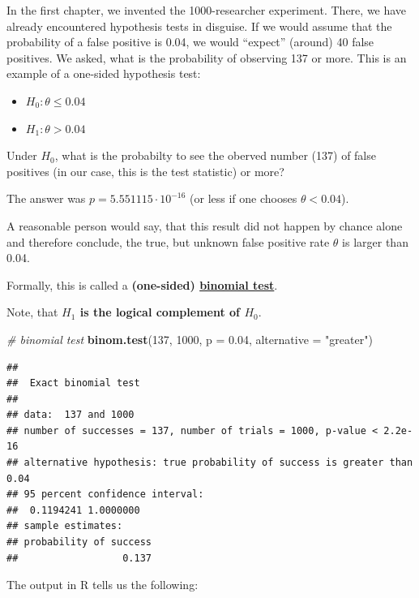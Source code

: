 \documentclass[
]{book}
\newenvironment{Shaded}{\begin{snugshade}}{\end{snugshade}}
\newcommand{\AttributeTok}[1]{\textcolor[rgb]{0.13,0.29,0.53}{#1}}
\newcommand{\CommentTok}[1]{\textcolor[rgb]{0.56,0.35,0.01}{\textit{#1}}}
\newcommand{\DecValTok}[1]{\textcolor[rgb]{0.00,0.00,0.81}{#1}}
\newcommand{\FloatTok}[1]{\textcolor[rgb]{0.00,0.00,0.81}{#1}}
\newcommand{\FunctionTok}[1]{\textcolor[rgb]{0.13,0.29,0.53}{\textbf{#1}}}
\newcommand{\NormalTok}[1]{#1}
\newcommand{\StringTok}[1]{\textcolor[rgb]{0.31,0.60,0.02}{#1}}
\providecommand{\tightlist}{%
  \setlength{\itemsep}{0pt}\setlength{\parskip}{0pt}}
\begin{document}
In the first chapter, we invented the 1000-researcher experiment. There, we have already encountered hypothesis tests in disguise.
If we would assume that the probability of a false positive is 0.04,
we would ``expect'' (around) 40 false positives. We asked, what is the probability of observing
137 or more. This is an example of a one-sided hypothesis test:

\begin{itemize}
\tightlist
\item
  \(H_0: \theta \le 0.04\)
\item
  \(H_1: \theta > 0.04\)
\end{itemize}

Under \(H_0\), what is the probabilty to see the oberved number (137) of
false positives (in our case, this is the test statistic) or more?

The answer was \(p = 5.551115 \cdot 10^{-16}\) (or less if one chooses \(\theta < 0.04\)).

A reasonable person would say, that this result did not happen by chance alone and
therefore conclude, the true, but unknown false positive rate \(\theta\) is larger than 0.04.

Formally, this is called a \textbf{(one-sided) \href{https://en.wikipedia.org/wiki/Binomial_test}{binomial test}}.

Note, that \textbf{\(H_1\) is the logical complement of \(H_0\)}.

\begin{Shaded}
\begin{Highlighting}[]
\CommentTok{\# binomial test}
\FunctionTok{binom.test}\NormalTok{(}\DecValTok{137}\NormalTok{, }\DecValTok{1000}\NormalTok{, }\AttributeTok{p =} \FloatTok{0.04}\NormalTok{, }\AttributeTok{alternative =} \StringTok{"greater"}\NormalTok{)}
\end{Highlighting}
\end{Shaded}

\begin{verbatim}
## 
##  Exact binomial test
## 
## data:  137 and 1000
## number of successes = 137, number of trials = 1000, p-value < 2.2e-16
## alternative hypothesis: true probability of success is greater than 0.04
## 95 percent confidence interval:
##  0.1194241 1.0000000
## sample estimates:
## probability of success 
##                  0.137
\end{verbatim}

The output in R tells us the following:
\end{document}
